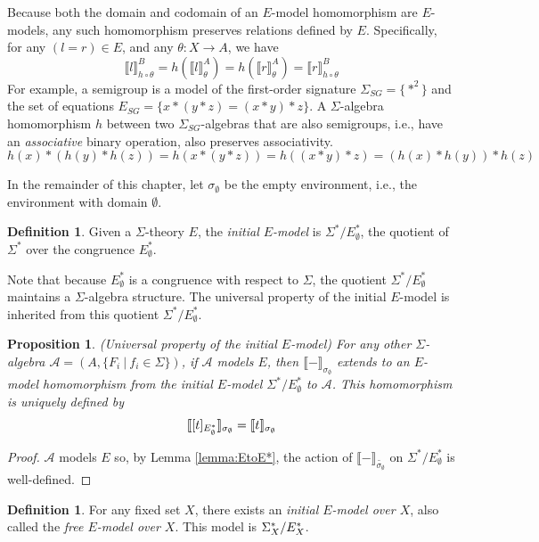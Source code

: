 \documentclass{msthesis}
\newtheorem{prop}[theorem]{Proposition}
\theoremstyle{definition}
\newtheorem{definition}[theorem]{Definition}
\newcommand{\semof}[1]{\llbracket{#1}\rrbracket}
\newcommand{\Amod}{\mathscr{A}}
\begin{document}
Because both the domain and codomain of an $E$-model homomorphism are $E$-models, any such homomorphism preserves relations defined by $E$. Specifically, for any $(l=r) \in E$, and any $\theta : X \to A$, we have 
\[ \semof{l}_{h \circ \theta}^B = h(\semof{l}_\theta^A) = h(\semof{r}_\theta^A) = \semof{r}_{h \circ \theta}^B\]
For example, a semigroup is a model of the first-order signature $\Sigma_{SG} = \{*^2\}$ and the set of equations $E_{SG}=\{x * (y * z) = (x * y) * z\}$.  A $\Sigma$-algebra homomorphism $h$ between two $\Sigma_{SG}$-algebras that are also semigroups, i.e., have an \textit{associative} binary operation, also preserves associativity. 
\[h(x) * (h(y) * h(z)) = h(x * (y * z)) = h((x * y) * z) = (h(x) * h(y)) * h(z) \]

In the remainder of this chapter, let $\sigma_\emptyset$ be the empty environment, i.e., the environment with domain $\emptyset$.

\begin{definition}
    Given a $\Sigma$-theory $E$, the \emph{initial $E$-model} is $\Sigma^*/E^*_\emptyset$, the quotient of $\Sigma^*$ over the congruence $E^*_\emptyset$.
\end{definition}

Note that because $E^*_\emptyset$ is a congruence with respect to $\Sigma$, the quotient $\Sigma^*/E^*_\emptyset$ maintains a $\Sigma$-algebra structure.  The universal property of the initial $E$-model is inherited from this quotient $\Sigma^*/E^*_\emptyset$. 

\begin{prop}(Universal property of the initial $E$-model)
     For any other $\Sigma$-algebra $\Amod=(A, \{F_i\ |\ f_i \in \Sigma\})$, if $\Amod$ models $E$, then $\semof{-}_{\sigma_\emptyset}$ extends to an $E$-model homomorphism from the initial $E$-model $\Sigma^*/E^*_\emptyset$ to $\Amod$.  This homomorphism is uniquely defined by
\begin{equation}\label{eq:init_E_hom}
\semof{[t]_{\thof{\emptyset}}}_{\sigma_\emptyset} = \semof{t}_{\sigma_\emptyset}
\end{equation}
\end{prop}
\begin{proof}
    $\Amod$ models $E$ so, by Lemma \ref{lemma:EtoE*}, the action of $\semof{-}_{\tilde{\sigma_\emptyset}}$ on $\Sigma^*/E^*_\emptyset$ is well-defined.
\end{proof}

\begin{definition}
    For any fixed set $X$, there exists an \emph{initial $E$-model over $X$}, also called the \emph{free $E$-model over $X$}.  This model is $\Sigma^*_X/E^*_{X}$.
\end{definition}
\end{document}
